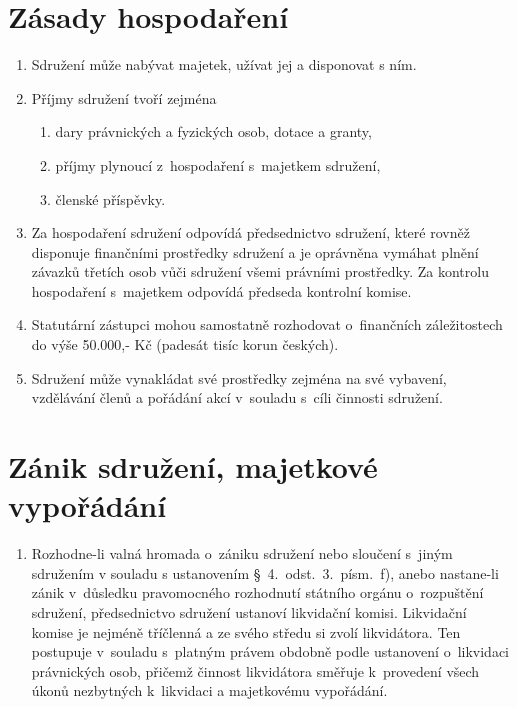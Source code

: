 \documentclass[a4paper]{article}
\begin{document}
\section{Zásady hospodaření}
    \begin{enumerate}
    \item Sdružení může nabývat majetek, užívat jej a disponovat s ním.

    \item Příjmy sdružení tvoří zejména
        \begin{enumerate}
        \item dary právnických a fyzických osob, dotace a granty,
        \item příjmy plynoucí z~hospodaření s~majetkem sdružení,
        \item členské příspěvky.
        \end{enumerate}

    \item Za hospodaření sdružení odpovídá předsednictvo sdružení, které
        rovněž disponuje finančními prostředky sdružení a je oprávněna vymáhat
        plnění závazků třetích osob vůči sdružení všemi právními prostředky.
        Za kontrolu hospodaření s~majetkem odpovídá předseda kontrolní komise.

    \item Statutární zástupci mohou samostatně rozhodovat o~finančních
        záležitostech do výše 50.000,- Kč (padesát tisíc korun českých).

    \item Sdružení může vynakládat své prostředky zejména na své vybavení,
        vzdělávání členů a pořádání akcí v~souladu s~cíli činnosti sdružení.
    \end{enumerate}



\section{Zánik sdružení, majetkové vypořádání}
    \begin{enumerate}
    \item Rozhodne-li valná hromada o~zániku sdružení nebo sloučení s~jiným
        sdružením v souladu s ustanovením \S~4.~odst.~3.~písm.~f), anebo nastane-li zánik
        v~důsledku pravomocného rozhodnutí státního orgánu o~rozpuštění
        sdružení, předsednictvo sdružení ustanoví likvidační komisi.
        Likvidační komise je nejméně tříčlenná a ze svého středu si zvolí
        likvidátora. Ten postupuje v~souladu s~platným právem obdobně podle
        ustanovení o~likvidaci právnických osob, přičemž činnost likvidátora
        směřuje k~provedení všech úkonů nezbytných k~likvidaci a majetkovému
        vypořádání.
    \end{enumerate}
\end{document}
